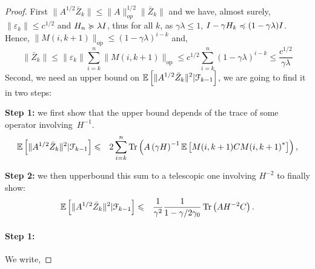\begin{proof}
First $\| A^{1/2} \bar{Z}_k \| \leqslant \|A\|_{op}^{1/2} \| \bar{Z}_k \|$ and we have, almost surely, $\| \varepsilon_k  \| \leqslant c^{1/2} $ and $ H_n \succcurlyeq \lambda I $, thus for all $k$, as $\gamma\lambda \leqslant 1$, $I - \gamma H_k \preccurlyeq (1-\gamma\lambda) I$. Hence,  $\| M(i,k+1) \|_{\textrm {op}} \leqslant ( 1- \gamma \lambda)^{i-k}$ and,
$$ \| \bar{Z}_k \| \leqslant \|\varepsilon_k\| \sum_{i=k}^n \| M(i,k+1) \|_{\textrm {op}}
 \leqslant
c^{1/2} \sum_{i=k}^n ( 1- \gamma \lambda)^{i-k} 
 \leqslant
\frac{c^{1/2} }{\gamma \lambda}
 $$
Second, we need an upper bound on $\displaystyle {\mathbb E} \left[ \|A^{1/2}\bar{Z}_k\|^2 | \mathcal{F}_{k-1} \right]$, we are going to find it in two steps: 
\BIT
\item \textbf{Step 1:} we first show that the upper bound depends of the trace of some operator involving~$H^{-1}$. \begin{eqnarray*}
{\mathbb E} \left[ \|A^{1/2} \bar{Z}_k\|^2 | \mathcal{F}_{k-1} \right]
& \leqslant & 2 \sum_{i=k}^n \operatorname{Tr}\left( A \left(\gamma H\right)^{-1}{\mathbb E} \left[    M(i,k+1) C {M(i,k+1)}^*\right] \right),
\end{eqnarray*} 
\item \textbf{Step 2:} we then upperbound this sum to a telescopic one involving $H^{-2}$ to finally show: \begin{eqnarray*}
{\mathbb E} \left[ \|A^{1/2} \bar{Z}_k\|^2 | \mathcal{F}_{k-1} \right]
& \leqslant & \frac{1}{\gamma^2}\frac{1}{1-\gamma/2\gamma_0} \operatorname{Tr} \left(AH^{-2} C \right).
\end{eqnarray*} 
\EIT

\paragraph{Step 1:} We write,


\end{proof}
